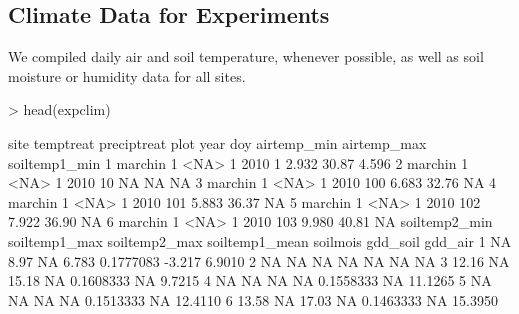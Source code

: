 \documentclass{article}
\begin{document}
\subsection{Climate Data for Experiments}
We compiled daily air and soil temperature, whenever possible, as well as soil moisture or humidity data for all sites.
\begin{Schunk}
\begin{Sinput}
> head(expclim)
\end{Sinput}
\begin{Soutput}
     site temptreat preciptreat plot year doy airtemp_min airtemp_max soiltemp1_min
1 marchin         1        <NA>    1 2010   1       2.932       30.87         4.596
2 marchin         1        <NA>    1 2010  10          NA          NA            NA
3 marchin         1        <NA>    1 2010 100       6.683       32.76            NA
4 marchin         1        <NA>    1 2010 101       5.883       36.37            NA
5 marchin         1        <NA>    1 2010 102       7.922       36.90            NA
6 marchin         1        <NA>    1 2010 103       9.980       40.81            NA
  soiltemp2_min soiltemp1_max soiltemp2_max soiltemp1_mean  soilmois gdd_soil gdd_air
1            NA          8.97            NA          6.783 0.1777083   -3.217  6.9010
2            NA            NA            NA             NA        NA       NA      NA
3         12.16            NA         15.18             NA 0.1608333       NA  9.7215
4            NA            NA            NA             NA 0.1558333       NA 11.1265
5            NA            NA            NA             NA 0.1513333       NA 12.4110
6         13.58            NA         17.03             NA 0.1463333       NA 15.3950
\end{Soutput}
\end{Schunk}
\end{document}
